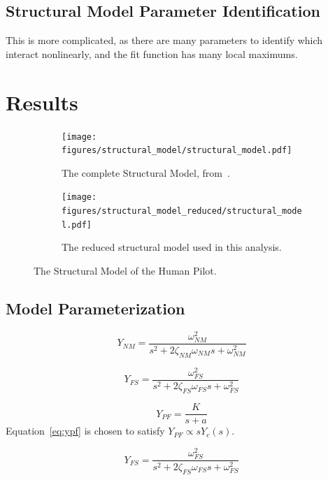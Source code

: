 \subsection{Structural Model Parameter Identification}
This is more complicated, as there are many parameters to identify which interact nonlinearly, and the fit function has many local maximums.

\section{Results}

\begin{figure}[h]
    \centering
    \begin{subfigure}[b]{0.49\textwidth}
        \centering
        \texttt{[image: figures/structural\_model/structural\_model.pdf]}
        \caption{The complete Structural Model, from~\cite{hess_unified_1997}.}
        \label{fig:structuralmodel}
    \end{subfigure}
    \hfill
    \begin{subfigure}[b]{0.49\textwidth}
        \centering
        \texttt{[image: figures/structural\_model\_reduced/structural\_model.pdf]}
        \caption{The reduced structural model used in this analysis.}
        \label{fig:structuralmodelreduced}
    \end{subfigure}
    \caption{The Structural Model of the Human Pilot.}
    \label{fig:structuralmodels}
\end{figure}

\subsection{Model Parameterization}
\begin{equation}
    Y_{NM} = \frac{\omega^2_{NM}}{s^2 + 2 \zeta_{NM} \omega_{NM} s + \omega^2_{NM}}
\end{equation}

\begin{equation}
    Y_{FS} = \frac{\omega^2_{FS}}{s^2 + 2 \zeta_{FS} \omega_{FS} s + \omega^2_{FS}}
\end{equation}

\begin{equation} \label{eq:ypf}
    Y_{PF} = \frac{K}{s+a}
\end{equation}
Equation~\ref{eq:ypf} is chosen to satisfy $Y_{PF} \propto s Y_c (s)$.

\begin{equation}
    Y_{FS} = \frac{\omega^2_{FS}}{s^2 + 2 \zeta_{FS} \omega_{FS} s + \omega^2_{FS}}
\end{equation}

